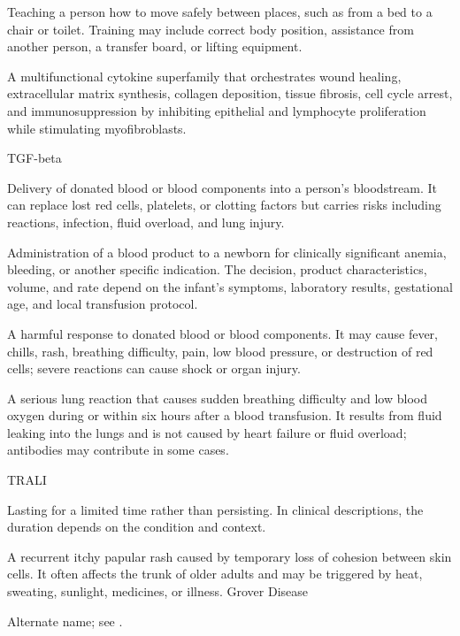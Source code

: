  Teaching a person how to move safely between places, such as from a bed to a chair or toilet. Training may include correct body position, assistance from another person, a transfer board, or lifting equipment.

 A multifunctional cytokine superfamily that orchestrates wound healing, extracellular matrix synthesis, collagen deposition, tissue fibrosis, cell cycle arrest, and immunosuppression by inhibiting epithelial and lymphocyte proliferation while stimulating myofibroblasts.

\synonyms
TGF-beta

 Delivery of donated blood or blood components into a person’s bloodstream. It can replace lost red cells, platelets, or clotting factors but carries risks including reactions, infection, fluid overload, and lung injury.

 Administration of a blood product to a newborn for clinically significant anemia, bleeding, or
another specific indication. The decision, product characteristics, volume, and rate depend
on the infant’s symptoms, laboratory results, gestational age, and local transfusion
protocol.

 A harmful response to donated blood or blood components. It may cause fever, chills, rash, breathing difficulty, pain, low blood pressure, or destruction of red cells; severe reactions can cause shock or organ injury.

 A serious lung reaction that causes sudden breathing difficulty and low blood oxygen during or within six hours after a blood transfusion. It results from fluid leaking into the lungs and is not caused by heart failure or fluid overload; antibodies may contribute in some cases.

\synonyms
TRALI

 Lasting for a limited time rather than persisting. In clinical descriptions, the duration depends on the condition and context.

 A recurrent itchy papular rash caused by temporary loss of cohesion between skin cells. It often affects the trunk of older adults and may be triggered by heat, sweating, sunlight, medicines, or illness.
\synonyms
Grover Disease

 Alternate name; see .


